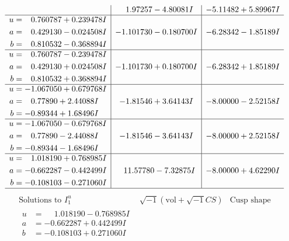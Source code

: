 \documentclass[1p]{elsarticle_modified}
\theoremstyle{definition}
\newcommand{\I}{\sqrt{-1}}
\begin{document}
$$\begin{array}{c|c|c}
 & \phantom{-}1.97257 - 4.80081 I & -5.11482 + 5.89967 I \\ \hline\begin{aligned}
u &= \phantom{-}0.760787 + 0.239478 I \\
a &= \phantom{-}0.429130 - 0.024508 I \\
b &= \phantom{-}0.810532 - 0.368894 I\end{aligned}
 & -1.101730 - 0.180700 I & -6.28342 - 1.85189 I \\ \hline\begin{aligned}
u &= \phantom{-}0.760787 - 0.239478 I \\
a &= \phantom{-}0.429130 + 0.024508 I \\
b &= \phantom{-}0.810532 + 0.368894 I\end{aligned}
 & -1.101730 + 0.180700 I & -6.28342 + 1.85189 I \\ \hline\begin{aligned}
u &= -1.067050 + 0.679768 I \\
a &= \phantom{-}0.77890 + 2.44088 I \\
b &= -0.89344 + 1.68496 I\end{aligned}
 & -1.81546 + 3.64143 I & -8.00000 - 2.52158 I \\ \hline\begin{aligned}
u &= -1.067050 - 0.679768 I \\
a &= \phantom{-}0.77890 - 2.44088 I \\
b &= -0.89344 - 1.68496 I\end{aligned}
 & -1.81546 - 3.64143 I & -8.00000 + 2.52158 I \\ \hline\begin{aligned}
u &= \phantom{-}1.018190 + 0.768985 I \\
a &= -0.662287 - 0.442499 I \\
b &= -0.108103 - 0.271060 I\end{aligned}
 & \phantom{-}11.57780 - 7.32875 I & -8.00000 + 4.62290 I\\
 \hline 
 \end{array}$$\newpage$$\begin{array}{c|c|c}  
\text{Solutions to }I^u_{1}& \I (\text{vol} + \sqrt{-1}CS) & \text{Cusp shape}\\
 \hline 
\begin{aligned}
u &= \phantom{-}1.018190 - 0.768985 I \\
a &= -0.662287 + 0.442499 I \\
b &= -0.108103 + 0.271060 I\end{aligned}

\end{array}$$
\end{document}
